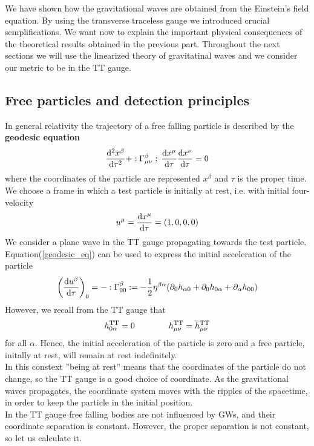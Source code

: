 We have shown how the gravitational waves are obtained from the Einstein's field equation. 
By using the transverse traceless gauge we introduced crucial semplifications. 
We want now to explain the important physical consequences of the theoretical results obtained in the previous part.
Throughout the next sections we will use the linearized theory of gravitatinal waves and we consider our metric to be in the TT gauge.
\subsection{Free particles and detection principles}
\label{free_particles_detection_principles}
In general relativity the trajectory of a free falling particle is described by the \textbf{geodesic equation}
\begin{equation}
\label{geodesic_eq}
\dv[2]{x^{\beta}}{\tau} + :\Gamma^{\beta} _{\mu \nu}: \,\dv{x^{\mu}}{\tau} \dv{x^{\nu}}{\tau} = 0
\end{equation}
where the coordinates of the particle are represented $x^{\beta}$ and $\tau$ is the proper time.\\
We choose a frame in which a test particle is initially at rest, i.e. with initial four-velocity
\[
u^{\mu} = \dv{x^{\mu}}{\tau} = (1,0,0,0)
\]
We consider a plane wave in the TT gauge propagating towards the test particle. \\
Equation(\ref{geodesic_eq}) can be used to express the initial acceleration of the particle
\[
\qty(
\dv{u^{\beta}}{\tau} 
)_{0}
=
- :\Gamma^{\beta} _{0 0}: 
= -\dfrac{1}{2} \eta ^{\beta \alpha}
\qty(
\partial_{0} h_{\alpha 0} + 
\partial_{0} h_{0 \alpha} + 
\partial_{\alpha} h_{0 0}
)
\]
However, we recall from the TT gauge that
\[
h^{\text{TT}}_{0 \alpha} = 0 \qquad  \qquad h^{\text{TT}}_{\mu \nu} = \bar{h}^{\text{TT}}_{\mu \nu} 
\]
for all $\alpha$. Hence, the initial acceleration of the particle is zero and a free particle, initally at rest, will remain at rest indefinitely.\\
In this constext ''being at rest'' means that the coordinates of the particle do not change, so the TT gauge is a good choice of coordinate. As the gravitational waves propagates, the coordinate system moves with the ripples of the spacetime, in order to keep the particle in the initial position. \\
In the TT gauge free falling bodies are not influenced by  GWs, and their coordinate separation is constant. However, the proper separation is not constant, so let us calculate it.\\
